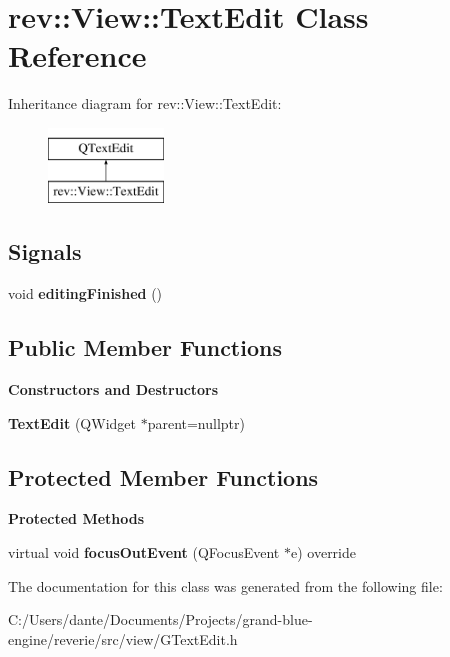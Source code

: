 \hypertarget{classrev_1_1_view_1_1_text_edit}{}\section{rev\+::View\+::Text\+Edit Class Reference}
\label{classrev_1_1_view_1_1_text_edit}
Inheritance diagram for rev\+::View\+::Text\+Edit\+:\begin{figure}[H]
\begin{center}
\leavevmode
\includegraphics[height=2.000000cm]{classrev_1_1_view_1_1_text_edit}
\end{center}
\end{figure}
\subsection*{Signals}
\begin{DoxyCompactItemize}
\item 
\mbox{\label{classrev_1_1_view_1_1_text_edit_a1fb670d122b9c072c3a4d7aa270301c7}} 
void {\bfseries editing\+Finished} ()
\end{DoxyCompactItemize}
\subsection*{Public Member Functions}
\begin{Indent}\textbf{ Constructors and Destructors}\par
\begin{DoxyCompactItemize}
\item 
\mbox{\label{classrev_1_1_view_1_1_text_edit_ab9362ae102be5ff3b6729add1581ad35}} 
{\bfseries Text\+Edit} (Q\+Widget $\ast$parent=nullptr)
\end{DoxyCompactItemize}
\end{Indent}
\subsection*{Protected Member Functions}
\begin{Indent}\textbf{ Protected Methods}\par
\begin{DoxyCompactItemize}
\item 
\mbox{\label{classrev_1_1_view_1_1_text_edit_a6946e8d8f4fc75515d6ce02020edee84}} 
virtual void {\bfseries focus\+Out\+Event} (Q\+Focus\+Event $\ast$e) override
\end{DoxyCompactItemize}
\end{Indent}


The documentation for this class was generated from the following file\+:\begin{DoxyCompactItemize}
\item 
C\+:/\+Users/dante/\+Documents/\+Projects/grand-\/blue-\/engine/reverie/src/view/G\+Text\+Edit.\+h\end{DoxyCompactItemize}
